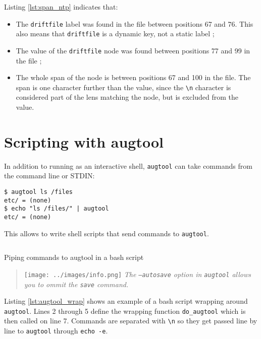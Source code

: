 Listing \ref{lst:span_ntp} indicates that:

\begin{itemize}
\item
  The \verb!driftfile! label was found in the file between positions 67 and 76. This also means that \verb!driftfile! is a dynamic key, not a static label ;
\item
  The value of the \verb!driftfile! node was found between positions 77 and 99 in the file ;
\item
  The whole span of the node is between positions 67 and 100 in the file. The span is one character further than the value, since the \verb!\n! character is considered part of the lens matching the node, but is excluded from the value.
\end{itemize}
\section{Scripting with augtool}


In addition to running as an interactive shell, \verb!augtool! can take commands from the command line or STDIN:

 

\begin{verbatim}
$ augtool ls /files
etc/ = (none)
$ echo "ls /files/" | augtool
etc/ = (none)
\end{verbatim}

This allows to write shell scripts that send commands to \verb!augtool!.

  

\begin{listing}[H]
  \inputminted[linenos,frame=leftline]{bash}{listings/augtool_wrap.sh}
  \caption{Piping commands to augtool in a bash script}
  \label{lst:augtool_wrap}
\end{listing}


\begin{quote}
\texttt{[image: ../images/info.png]} \emph{The \texttt{--autosave} option in \texttt{augtool} allows you to ommit the \texttt{save} command.}
\end{quote}

Listing \ref{lst:augtool_wrap} shows an example of a bash script wrapping around \verb!augtool!. Lines 2 through 5 define the wrapping function \verb!do_augtool! which is then called on line 7. Commands are separated with \verb!\n! so they get passed line by line to \verb!augtool! through \verb!echo -e!.


